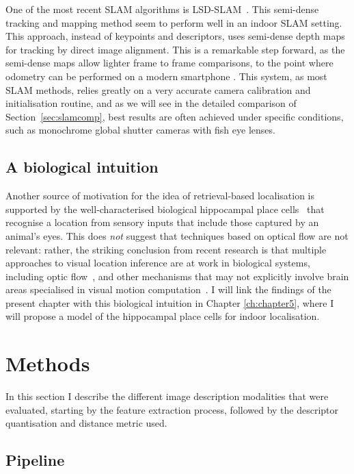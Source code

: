 One of the most recent SLAM algorithms is LSD-SLAM~\citep{engel14eccv}. This semi-dense tracking and mapping method seem to perform well in an indoor SLAM setting. This approach, instead of keypoints and descriptors, uses semi-dense depth maps for tracking by direct image alignment. This is a remarkable step forward, as the semi-dense maps allow lighter frame to frame comparisons, to the point where odometry can be performed on a modern smartphone \citep{schoeps14ismar}. This system, as most SLAM methods, relies greatly on a very accurate camera calibration and initialisation routine, and as we will see in the detailed comparison of Section~\ref{sec:slamcomp}, best results are often achieved under specific conditions, such as monochrome global shutter cameras with fish eye lenses.

\subsection{A biological intuition}

Another source of motivation for the idea of retrieval-based localisation is supported by the well-characterised biological hippocampal place cells~\cite{burgess2002human} that recognise a location from sensory inputs that include those captured by an animal's eyes. This does  \textit{not} suggest that techniques based on optical flow are not relevant: rather, the striking conclusion from recent research is that multiple approaches to visual location inference are at work in biological systems, including optic flow~\cite{Layton2014}, and other mechanisms that may not explicitly involve brain areas specialised in visual motion computation~\cite{hartley2014space}. I will link the findings of the present chapter with this biological intuition in Chapter \ref{ch:chapter5}, where I will propose a model of the hippocampal place cells for indoor localisation.


\section{Methods}
\label{sec:methods}

In this section I describe the different image description modalities that were evaluated, starting by the feature extraction process, followed by the descriptor quantisation and distance metric used.

\subsection{Pipeline}

